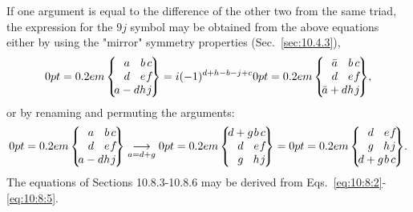 If one argument is equal to the difference of the other two from the same triad, the expression for the $9 j$ symbol may be obtained from the above equations either by using the "mirror" symmetry properties (Sec.~\ref{sec:10.4.3}),
\begin{equation}
\ninej{a}{b}{c  \label{eq:10:8:6}}{d}{e}{f}{a-d}{h}{j}=i(-1)^{d+h-b-j+c}\ninej{\bar{a}}{b}{c}{d}{e}{f}{\bar{a}+d}{h}{j},
\end{equation}
or by renaming and permuting the arguments:
\begin{equation}
\ninej{a}{b}{c  \label{eq:10:8:7}}{d}{e}{f}{a-d}{h}{j} \underset{a=d+g}{\longrightarrow}\ninej{d+g}{b}{c}{d}{e}{f}{g}{h}{j}=\ninej{d}{e}{f}{g}{h}{j}{d+g}{b}{c} .
\end{equation}
The equations of Sections 10.8.3-10.8.6 may be derived from Eqs.~\eqref{eq:10:8:2}-\eqref{eq:10:8:5}.

